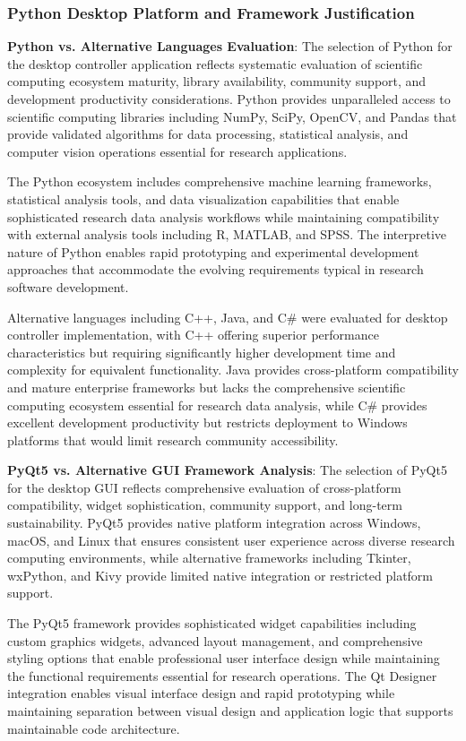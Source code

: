 \documentclass[11pt,a4paper]{article}
\begin{document}
\subsubsection{Python Desktop Platform and Framework Justification}

\textbf{Python vs. Alternative Languages Evaluation}: The selection of Python for the desktop controller application reflects
systematic evaluation of scientific computing ecosystem maturity, library availability, community support, and
development productivity considerations. Python provides unparalleled access to scientific computing libraries including
NumPy, SciPy, OpenCV, and Pandas that provide validated algorithms for data processing, statistical analysis, and
computer vision operations essential for research applications.

The Python ecosystem includes comprehensive machine learning frameworks, statistical analysis tools, and data
visualization capabilities that enable sophisticated research data analysis workflows while maintaining compatibility
with external analysis tools including R, MATLAB, and SPSS. The interpretive nature of Python enables rapid prototyping
and experimental development approaches that accommodate the evolving requirements typical in research software
development.

Alternative languages including C++, Java, and C\# were evaluated for desktop controller implementation, with C++
offering superior performance characteristics but requiring significantly higher development time and complexity for
equivalent functionality. Java provides cross-platform compatibility and mature enterprise frameworks but lacks the
comprehensive scientific computing ecosystem essential for research data analysis, while C\# provides excellent
development productivity but restricts deployment to Windows platforms that would limit research community
accessibility.

\textbf{PyQt5 vs. Alternative GUI Framework Analysis}: The selection of PyQt5 for the desktop GUI reflects comprehensive
evaluation of cross-platform compatibility, widget sophistication, community support, and long-term sustainability.
PyQt5 provides native platform integration across Windows, macOS, and Linux that ensures consistent user experience
across diverse research computing environments, while alternative frameworks including Tkinter, wxPython, and Kivy
provide limited native integration or restricted platform support.

The PyQt5 framework provides sophisticated widget capabilities including custom graphics widgets, advanced layout
management, and comprehensive styling options that enable professional user interface design while maintaining the
functional requirements essential for research operations. The Qt Designer integration enables visual interface design
and rapid prototyping while maintaining separation between visual design and application logic that supports
maintainable code architecture.
\end{document}
